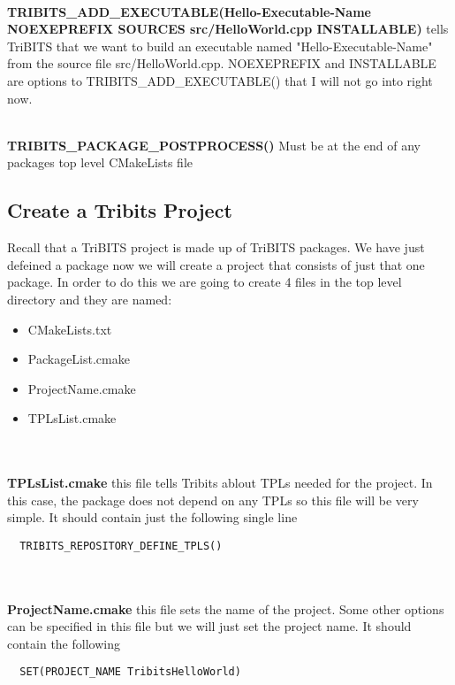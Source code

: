 \documentclass[12pt]{article}
\begin{document}
\textbf{\\TRIBITS\_ADD\_EXECUTABLE(Hello-Executable-Name NOEXEPREFIX SOURCES
  src/HelloWorld.cpp INSTALLABLE)} tells TriBITS that we want to build
an executable named "Hello-Executable-Name" from the source file
src/HelloWorld.cpp.  NOEXEPREFIX and INSTALLABLE are options to
TRIBITS\_ADD\_EXECUTABLE() that I will not go into right now.

\textbf{\\TRIBITS\_PACKAGE\_POSTPROCESS()} Must be at the end of any
packages top level CMakeLists file

\subsection*{Create a Tribits Project}

Recall that a TriBITS project is made up of TriBITS packages.  We have
just defeined a package now we will create a project that consists of
just that one package.  In order to do this we are going to create 4
files in the top level directory and they are named:

\begin{itemize}
\item CMakeLists.txt
\item PackageList.cmake
\item ProjectName.cmake
\item TPLsList.cmake
\end{itemize}



\textbf{\\\\TPLsList.cmake} this file tells Tribits ablout TPLs needed for
the project.  In this case, the package does not depend on any TPLs so
this file will be very simple.  It should contain just the following
single line

\begin{verbatim}
  TRIBITS_REPOSITORY_DEFINE_TPLS()
\end{verbatim}\\

\textbf{\\ProjectName.cmake} this file sets the name of the project.  Some other options can be specified in this file but we
will just set the project name. It should contain the following
  
\begin{verbatim}
  SET(PROJECT_NAME TribitsHelloWorld)
\end{verbatim}\\
\end{document}
